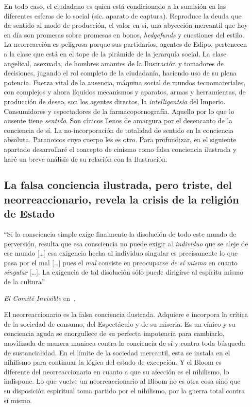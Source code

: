 En todo caso, el ciudadano es quien está condicionado a la sumisión en las diferentes esferas de lo social (sic. aparato de captura). Reproduce la deuda que da sentido al modo de producción, el valor en sí, una abyección mercantil que hoy en día son promesas sobre promesas en bonos, \emph{hedgefunds} y cuestiones del estilo. La neorreacción es peligrosa porque sus partidarios, agentes de Edipo, pertenecen a la clase que está en el tope de la pirámide de la jerarquía social. La clase angelical, asexuada, de hombres amantes de la Ilustración y tomadores de decisiones, jugando el rol completo de la ciudadanía, haciendo uso de su plena potencia. Fuerza vital de la ausencia, máquina social de mundos tecnomateriales, con complejos y ahora líquidos mecanismos y aparatos, armas y herramientas, de producción de deseo, son los agentes directos, la \emph{intelligentsia} del Imperio. Consumidores y espectadores de la farmacopornografía. Aquello por lo que lo ausente tiene \emph{sentido}. Son cínicos llenos de amargura por el desencanto de la conciencia de sí. La no-incorporación de totalidad de sentido en la conciencia absoluta. Paranoicos cuyo cuerpo les es otro. Para profundizar, en el siguiente apartado desarrollaré el concepto de cinismo como falsa conciencia ilustrada y haré un breve análisis de su relación con la Ilustración.

\subsection{La falsa conciencia ilustrada, pero triste, del neorreaccionario, revela la crisis de la religión de Estado}
\label{la-falsa-conciencia-ilustrada}

\epigraph{\enquote{Si la consciencia simple exige finalmente la disolución de todo este mundo de perversión, resulta que esa consciencia no puede exigir al \emph{individuo} que se aleje de ese mundo [\ldots] esa exigencia hecha al individuo singular es precisamente lo que pasa por el mal [\ldots] pues el \emph{mal} consiste en preocuparse \emph{de sí mismo} en cuanto \emph{singular} [\ldots]. La exigencia de tal disolución sólo puede dirigirse al espíritu mismo de la cultura}}{\emph{El Comité Invisible} en~\autocite{tiqqunTesisSobrePartido}.}

El neorreaccionario es la falsa conciencia ilustrada. Adquiere e incorpora la crítica de la sociedad de consumo, del Espectáculo y de su miseria. Es un cínico y su conciencia aguda se enorgullece de su perfecta impotencia para cambiarlo, movilizada de manera maniaca contra la conciencia de sí y contra toda búsqueda de sustancialidad. En el límite de la sociedad mercantil, esta se instala en el nihilismo para continuar la lógica del estado de excepción. Y el Bloom es diferente del neorreaccionario en cuanto a que su afección es el nihilismo, lo indispone. Lo que vuelve un neorreaccionario al Bloom no es otra cosa sino que su disposición espiritual toma partido por el nihilismo, por la guerra total contra sí mismo.

